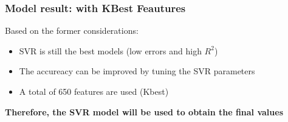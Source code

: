 \begin{frame}
    \frametitle{Model result: with KBest Feautures}
    \begin{table}[]
        
    \end{table}
    Based on the former considerations:
    \begin{itemize}
        \item SVR is still the best models (low errors and high $R^2$)
        \item The accureacy can be improved by tuning the SVR parameters
        \item A total of 650 features are used (Kbest)
    \end{itemize}
    \textbf{Therefore, the SVR model will be used to obtain the final values}






\end{frame}